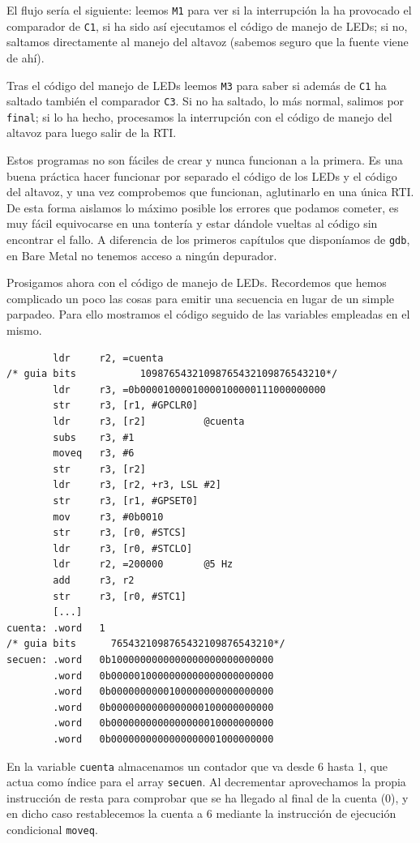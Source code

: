 El flujo sería el siguiente: leemos {\tt M1} para ver si la interrupción la ha provocado el
comparador de {\tt C1}, si ha sido así ejecutamos el código de manejo de LEDs; si no,
saltamos directamente al manejo del altavoz (sabemos seguro que la fuente viene de ahí).

Tras el código del manejo de LEDs leemos {\tt M3} para saber si además de {\tt C1} ha
saltado también el comparador {\tt C3}. Si no ha saltado, lo más normal, salimos por
{\tt final}; si lo ha hecho, procesamos la interrupción con el código de manejo del altavoz
para luego salir de la RTI.

Estos programas no son fáciles de crear y nunca funcionan a la primera. Es una buena práctica
hacer funcionar por separado el código de los LEDs y el código del altavoz, y una vez
comprobemos que funcionan, aglutinarlo en una única RTI. De esta forma aislamos lo máximo
posible los errores que podamos cometer, es muy fácil equivocarse en una tontería y estar
dándole vueltas al código sin encontrar el fallo. A diferencia de los primeros capítulos
que disponíamos de {\tt gdb}, en Bare Metal no tenemos acceso a ningún depurador.

Prosigamos ahora con el código de manejo de LEDs. Recordemos que hemos complicado un poco
las cosas para emitir una secuencia en lugar de un simple parpadeo. Para ello mostramos
el código seguido de las variables empleadas en el mismo.

\begin{lstlisting}
        ldr     r2, =cuenta
/* guia bits           10987654321098765432109876543210*/
        ldr     r3, =0b00001000010000100000111000000000
        str     r3, [r1, #GPCLR0]
        ldr     r3, [r2]          @cuenta
        subs    r3, #1
        moveq   r3, #6
        str     r3, [r2]
        ldr     r3, [r2, +r3, LSL #2]
        str     r3, [r1, #GPSET0]
        mov     r3, #0b0010
        str     r3, [r0, #STCS]
        ldr     r3, [r0, #STCLO]
        ldr     r2, =200000       @5 Hz
        add     r3, r2
        str     r3, [r0, #STC1]
        [...]
cuenta: .word   1
/* guia bits      7654321098765432109876543210*/
secuen: .word   0b1000000000000000000000000000
        .word   0b0000010000000000000000000000
        .word   0b0000000000100000000000000000
        .word   0b0000000000000000100000000000
        .word   0b0000000000000000010000000000
        .word   0b0000000000000000001000000000
\end{lstlisting}

En la variable {\tt cuenta} almacenamos un contador que va desde 6 hasta 1, que actua
como índice para el array {\tt secuen}. Al decrementar aprovechamos la propia instrucción de
resta para comprobar que se ha llegado al final de la cuenta (0), y en dicho caso
restablecemos la cuenta a 6 mediante la instrucción de ejecución condicional {\tt moveq}.

